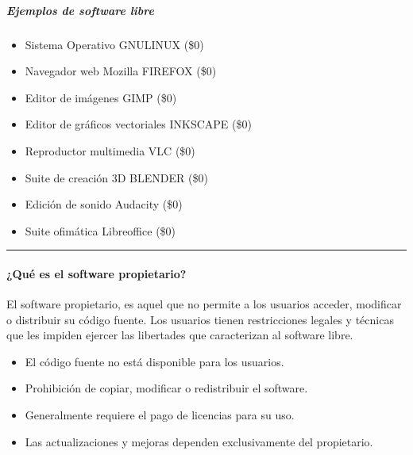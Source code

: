 \documentclass[letterpaper,10pt,spanish]{sphinxmanual}
\begin{document}
\subparagraph{Ejemplos de software libre}
\label{\detokenize{cursos/ofimatica10/periodo01/R01:ejemplos-de-software-libre}}\begin{itemize}
\item {} 
\sphinxAtStartPar
Sistema Operativo GNU\sphinxhyphen{}LINUX (\$0)

\item {} 
\sphinxAtStartPar
Navegador web Mozilla FIREFOX (\$0)

\item {} 
\sphinxAtStartPar
Editor de imágenes GIMP (\$0)

\item {} 
\sphinxAtStartPar
Editor de gráficos vectoriales INKSCAPE (\$0)

\item {} 
\sphinxAtStartPar
Reproductor multimedia VLC (\$0)

\item {} 
\sphinxAtStartPar
Suite de creación 3D BLENDER (\$0)

\item {} 
\sphinxAtStartPar
Edición de sonido Audacity (\$0)

\item {} 
\sphinxAtStartPar
Suite ofimática Libreoffice (\$0)

\end{itemize}


\bigskip\hrule\bigskip



\paragraph{¿Qué es el software propietario?}
\label{\detokenize{cursos/ofimatica10/periodo01/R01:que-es-el-software-propietario}}
\sphinxAtStartPar
El software propietario, es aquel que no permite a los usuarios acceder, modificar o distribuir su código fuente. Los usuarios tienen restricciones legales y técnicas que les impiden ejercer las libertades que caracterizan al software libre.
\begin{itemize}
\item {} 
\sphinxAtStartPar
El código fuente no está disponible para los usuarios.

\item {} 
\sphinxAtStartPar
Prohibición de copiar, modificar o redistribuir el software.

\item {} 
\sphinxAtStartPar
Generalmente requiere el pago de licencias para su uso.

\item {} 
\sphinxAtStartPar
Las actualizaciones y mejoras dependen exclusivamente del propietario.

\end{itemize}
\end{document}
